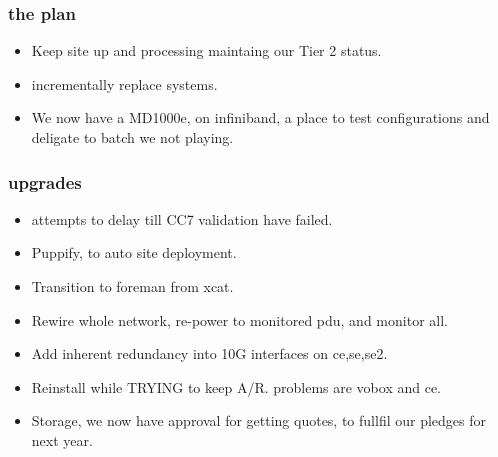 \documentclass{beamer}
\begin{document}
\begin{frame}
  \frametitle{the plan}
  \begin{itemize}
    \item Keep site up and processing maintaing our Tier 2 status.
    \item incrementally replace systems.
    \item We now have a MD1000e, on infiniband, a place to test configurations and deligate to batch
        we not playing.
  \end{itemize}
\end{frame}


\begin{frame}
  \frametitle{upgrades}
  \begin{itemize}
    \item attempts to delay till CC7 validation have failed.
    \item Puppify, to auto site deployment.
    \item Transition to foreman from xcat.
    \item Rewire whole network, re-power to monitored pdu, and monitor all.
    \item Add inherent redundancy into 10G interfaces on ce,se,se2.
    \item Reinstall while TRYING to keep A/R. problems are vobox and ce. 
    \item Storage, we now have approval for getting quotes, to fullfil our pledges for next year.
  \end{itemize}
\end{frame}
\end{document}
